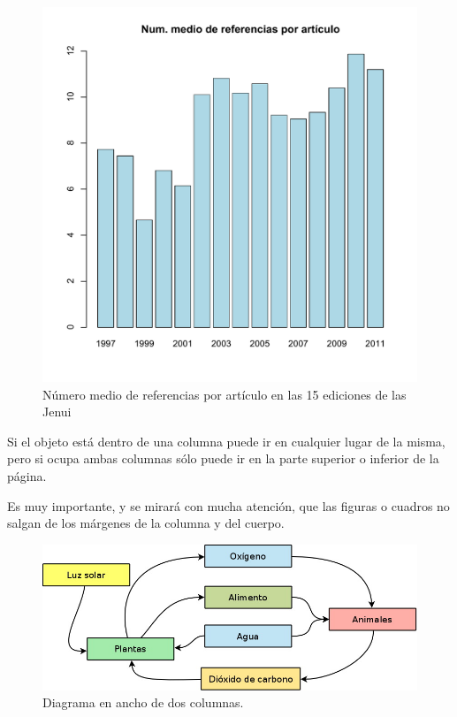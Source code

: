 \documentclass[twocolumn,twoside,a4paper, 10pt]{article}
\begin{document}

\begin{figure}[htbp]
\centerline{\includegraphics[width=\linewidth]{mediaref}}
\caption{\label{fig:medias} Número medio de referencias por artículo en las 15 ediciones de las Jenui} 
\label{fig:mxm_peco} 
\end{figure}

Si el objeto está dentro de una columna puede ir en cualquier lugar 
de la misma, pero si ocupa ambas columnas sólo puede ir en la parte 
superior o inferior de la página.

Es muy importante, y se mirará con mucha atención, que las figuras o 
cuadros no salgan de los márgenes de la columna y del cuerpo.
\begin{figure}
	\begin{center}
	\includegraphics[width = 0.8\linewidth]{diagrLargo.jpg}
	\end{center}
	\caption{Diagrama en ancho de dos columnas.}
\end{figure}
\end{document}

